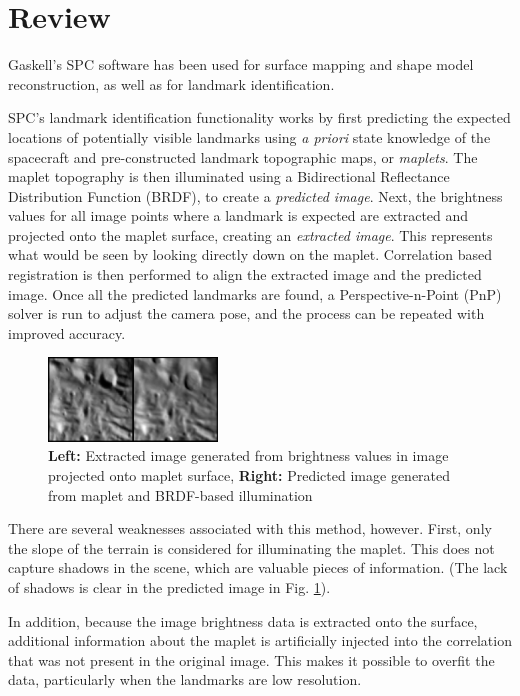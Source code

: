 \documentclass{RPI-SIW}
\begin{document}
\section*{Review}
Gaskell's SPC software has been used for surface mapping and shape model reconstruction, as well as for landmark identification.\cite{gaskell2008} 

SPC's landmark identification functionality works by first predicting the expected locations of potentially visible landmarks using \textit{a priori} state knowledge of the spacecraft and pre-constructed landmark topographic maps, or \textit{maplets}.  The maplet topography is then illuminated using a Bidirectional Reflectance Distribution Function (BRDF), to create a \textit{predicted image}.  Next, the brightness values for all image points where a landmark is expected are extracted and projected onto the maplet surface, creating an \textit{extracted image}.  This represents what would be seen by looking directly down on the maplet.  Correlation based registration is then performed to align the extracted image and the predicted image.  Once all the predicted landmarks are found, a Perspective-n-Point (PnP) solver is run to adjust the camera pose, and the process can be repeated with improved accuracy.\cite{gaskell2011}

\begin{figure}[H]
	\centering
	\includegraphics[width=0.4\textwidth]{figs/spc_sample.png}
	\caption{\textbf{Left:} Extracted image generated from brightness values in image projected onto maplet surface, \textbf{Right:} Predicted image generated from maplet and BRDF-based illumination}
	\label{figs::spc_match}
\end{figure}

There are several weaknesses associated with this method, however.  First, only the slope of the terrain is considered for illuminating the maplet.  This does not capture shadows in the scene, which are valuable pieces of information.  (The lack of shadows is clear in the predicted image in Fig. \ref{figs::spc_match}).  

In addition, because the image brightness data is extracted onto the surface, additional information about the maplet is artificially injected into the correlation that was not present in the original image.  This makes it possible to overfit the data, particularly when the landmarks are low resolution.
\end{document}
